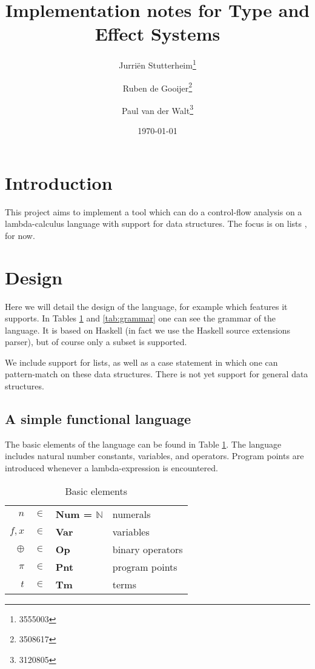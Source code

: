 \documentclass[a4paper]{article}
\author{Jurri\"en Stutterheim\footnote{3555003}\and Ruben de Gooijer\footnote{3508617}\and Paul van der Walt\footnote{3120805}}
\date{\today}
\title{Implementation notes for Type and Effect Systems}
\begin{document}
\maketitle \tableofcontents

\section{Introduction}

This project aims to implement a tool which can do a control-flow analysis on a lambda-calculus language with support for
data structures. The focus is on lists%
, for now.

\section{Design}

Here we will detail the design of the language, for example which features it
supports. In Tables \ref{tab:elems} and \ref{tab:grammar} one can see the
grammar of the language. It is based on Haskell (in fact we use the Haskell
source extensions parser), but of course only a subset is supported. 

We include support for%
 lists, as well as a case statement in which one
can pattern-match on these data structures. There is not yet support for general
data structures.

\subsection{A simple functional language}


The basic elements of the language can be found in Table \ref{tab:elems}. The
language includes natural number constants, variables, and operators. Program
points are introduced whenever a lambda-expression is encountered.
\begin{table}
    \begin{centering}
    \begin{tabular}{rcll}
        $n$ &           $\in$ & \textbf{Num = $\mathds{N}$}& numerals \\
        $f,x$ &         $\in$ & \textbf{Var}               & variables \\
        $\oplus$ &      $\in$ & \textbf{Op}                & binary operators \\
        $\pi$ &         $\in$ & \textbf{Pnt}               & program points  \\
        $t$ &           $\in$ & \textbf{Tm}                & terms \\
    \end{tabular}
    \caption{\label{tab:elems}Basic elements}
    \end{centering}
\end{table}
\end{document}
